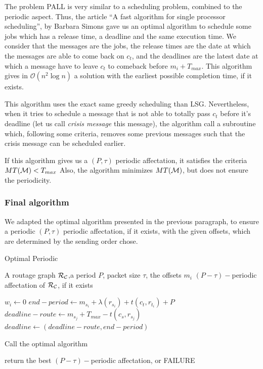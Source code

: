 \documentclass[a4paper,10pt]{article}
\begin{document}
     The problem PALL is very similar to a scheduling problem, combined to the periodic aspect. Thus, the article ``A fast algorithm for single processor scheduling'', by Barbara Simons \cite{simons1978fast} gave us an optimal algorithm to schedule some jobs which has a release time, a deadline and the same execution time. We consider that the messages are the jobs, the release times are the date at which the messages are able to come back on $c_t$, and the deadlines are the latest date at which a message have to leave $c_t$ to comeback before $m_i + T_{max}$. This algorithm gives in $\mathcal{O}(n^2\log{}n)$ a solution with the earliest  possible completion time, if it exists.
     
     This algorithm uses the exact same greedy scheduling than LSG. Nevertheless, when it tries to schedule a message that is not able to totally pass $c_t$ before it's deadline (let us call {\em crisis message} this message), the algorithm call a subroutine which, following some criteria, removes some previous messages such that the crisis message can be scheduled earlier.
     
     If this algorithm gives us a $(P,\tau)$ periodic affectation, it satisfies the criteria $MT({\cal M}) < T_{max}$ Also, the algorithm minimizes $MT({\cal M})$, but does not ensure the periodicity.
     
      
     \subsubsection{Final algorithm}
     
     We adapted the optimal algorithm presented in the previous paragraph, to ensure a periodic $(P,\tau)$ periodic affectation, if it exists, with the given offsets, which are determined by the sending order chose.
     
     
          
   
     
    \begin{algorithm}[H]
    \caption{Optimal Periodic}
    \begin{algorithmic}
    \REQUIRE A routage graph ${\cal R_{\cal C}}$,a period $P$, packet size $\tau$, the offsets $m_i$
    \ENSURE $(P-\tau)-$periodic affectation of ${\cal R_{\cal C}}$, if it exists
  
    \STATE  $w_i \leftarrow 0$
    \STATE $end-period \leftarrow m_{s_i} + \lambda(r_{s_i}) + t(c_t,r_{t_i}) + P$
    \STATE $deadline-route \leftarrow m_{s_j} + T_{max}-t(c_s,r_{s_j})$
    \STATE $deadline \leftarrow (deadline-route,end-period)$
    \ENDFOR
    
    \STATE Call the optimal algorithm

    
    \ENDFOR

    \STATE return the best $(P-\tau)-$periodic affectation, or FAILURE

    \end{algorithmic}
    \end{algorithm}
    
\end{document}
